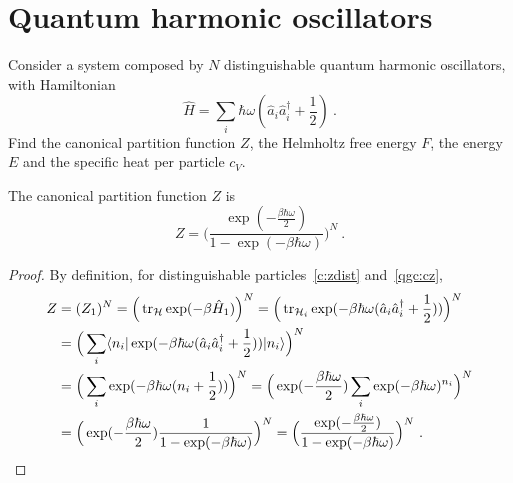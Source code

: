 \section{Quantum harmonic oscillators}

    \begin{exercise}
        Consider a system composed by $N$ distinguishable quantum harmonic oscillators, with Hamiltonian 
        \begin{equation*}
            \hat H = \sum_i \hbar \omega (\hat a_i \hat a_i^\dagger + \frac{1}{2}) ~.
        \end{equation*}
        Find the canonical partition function $Z$, the Helmholtz free energy $F$, the energy $E$ and the specific heat per particle $c_V$.
    \end{exercise}

    The canonical partition function $Z$ is 
    \begin{equation*}
        Z = \Big ( \frac{\exp(- \frac{\beta \hbar \omega}{2})}{1 - \exp(- \beta \hbar \omega)} \Big)^N ~.
    \end{equation*}
    \begin{proof}
        By definition, for distinguishable particles~\eqref{c:zdist} and~\eqref{qgc:cz},
        \begin{equation*}
        \begin{aligned}
            Z & = (Z_1)^N = \Big (\operatorname{tr}_{\mathcal H} \exp(- \beta \hat H_1) \Big)^N = \Big (\operatorname{tr}_{\mathcal H_i} \exp(- \beta \hbar \omega (\hat a_i \hat a_i^\dagger + \frac{1}{2})) \Big)^N \\ & = \Big ( \sum_i \langle n_i\vert\exp(- \beta \hbar \omega (\hat a_i \hat a_i^\dagger + \frac{1}{2})) \vert n_i \rangle\Big)^N \\ & = \Big ( \sum_i \exp(- \beta \hbar \omega (n_i + \frac{1}{2})) \Big)^N = \Big ( \exp(- \frac{\beta \hbar \omega}{2}) \sum_i \exp(- \beta \hbar \omega)^{n_i} \Big)^N \\ & = \Big ( \exp(- \frac{\beta \hbar \omega}{2}) \frac{1}{1 - \exp(- \beta \hbar \omega)} \Big)^N = \Big ( \frac{\exp(- \frac{\beta \hbar \omega}{2})}{1 - \exp(- \beta \hbar \omega)} \Big)^N ~.
        \end{aligned}
        \end{equation*}
    \end{proof}

